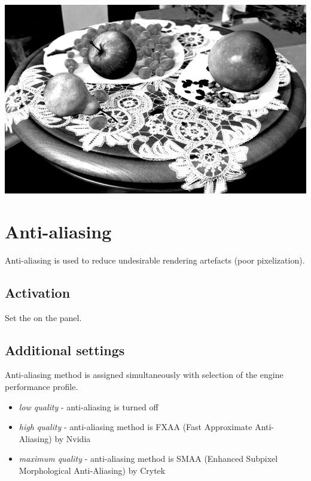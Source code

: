 \documentclass[a4paper,12pt,oneside]{sphinxmanual}
\begin{document}
{\hfill\includegraphics[width=1.000\linewidth]{color_correction.jpg}\hfill}

\begin{DUlineblock}{0em}
\item[] 
\end{DUlineblock}


\section{Anti-aliasing}
\label{postprocessing_effects:antialiasing}\label{postprocessing_effects:index-7}\label{postprocessing_effects:id26}
Anti-aliasing is used to reduce undesirable rendering artefacts (poor pixelization).


\subsection{Activation}
\label{postprocessing_effects:id27}
Set the  on the  panel.


\subsection{Additional settings}
\label{postprocessing_effects:id28}
Anti-aliasing method is assigned simultaneously with selection of the engine performance profile.
\begin{itemize}
\item {} 
\emph{low quality} - anti-aliasing is turned off

\item {} 
\emph{high quality} - anti-aliasing method is FXAA (Fast Approximate Anti-Aliasing) by Nvidia

\item {} 
\emph{maximum quality} - anti-aliasing method is SMAA (Enhanced Subpixel Morphological Anti-Aliasing) by Crytek

\end{itemize}
\end{document}
